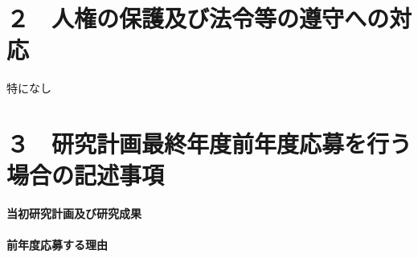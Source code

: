 \documentclass[11pt,a4j,dvipdfmx]{jarticle} 					%
\newcommand{\研究課題名}{新型半導体検出器を用いた真空の解明}
\newcommand{\研究機関名}{高エネルギー加速器研究機構}
\newcommand{\研究代表者氏名}{中村浩二}
\newcommand{\研究期間の最終元号年度}{10}  %
\begin{document}



\section{２　人権の保護及び法令等の遵守への対応}

特になし




\section{３　研究計画最終年度前年度応募を行う場合の記述事項}

\newcommand{\最終年度研究種目名}{}
\newcommand{\最終年度研究課題番号}{}
\newcommand{\最終年度研究課題名}{}
\newcommand{\最終年度研究期間}{令和\ \ 年度〜令和\一年目 年度}


\noindent
\textbf{当初研究計画及び研究成果}\\
\vspace{5cm}
\\

\noindent
\textbf{前年度応募する理由}\\








\end{document}
